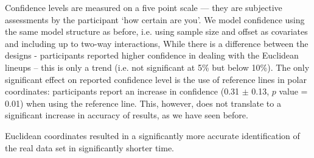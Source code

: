  Confidence levels are measured on a five point scale --- they are subjective assessments by the participant `how certain are you'. We model confidence using the same model structure as before, i.e. using sample size and offset as covariates and including up to two-way interactions,
While there is a difference between the designs - participants reported higher confidence in dealing with the Euclidean lineups -- this is only  a trend (i.e. not significant at 5\% but below 10\%). The only significant effect on reported confidence level is the use of reference lines in polar coordinates: participants report an increase in confidence (0.31 $\pm$ 0.13, $p$ value = 0.01) when using the reference line. This, however, does not translate to a significant increase in accuracy of results, as we have seen before.

 Euclidean coordinates resulted in a significantly more accurate identification of the real data set in significantly shorter time.

